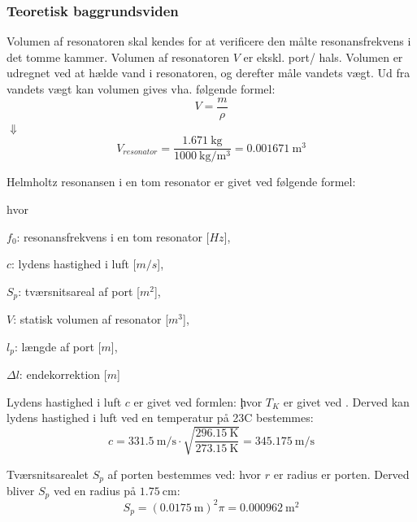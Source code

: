 	\subsubsection{Teoretisk baggrundsviden}	
Volumen af resonatoren skal kendes for at verificere den målte resonansfrekvens i det tomme kammer. 
Volumen af resonatoren $V$ er ekskl. port/ hals. Volumen er udregnet ved at hælde vand i resonatoren, og derefter måle vandets vægt. Ud fra vandets vægt kan volumen gives vha. følgende formel:  
\begin{equation}
  V=\frac{m}{\rho}
  \label{eq:vformel}
\end{equation}
$\Downarrow$
\begin{equation}
V_{resonator}=\frac{\SI{1,671}{\kilo\gram}}{\SI{1000}{\kilo \gram \per \meter^{3}}}={\SI{0,001671}{\meter^{3}}}
\end{equation}


Helmholtz resonansen i en tom resonator er givet ved følgende formel: \fnul

hvor 
\begin{description}[align=left, labelwidth=1in,labelindent=0.5cm]
\item $f_{0}$: resonansfrekvens i en tom resonator [$Hz$],\\
\item $c$: lydens hastighed i luft [$m/s$],\\
\item $S_{p}$: tværsnitsareal af port [$m^2$],\\
\item $V$: statisk volumen af resonator [$m^3$],\\
\item $l_{p}$: længde af port [$m$],\\
\item $\Delta l$: endekorrektion [$m$]\\
\end{description}
Lydens hastighed i luft $c$ er givet ved formlen: 
\c
hvor $T_{K}$ er givet ved \T. 
Derved kan lydens hastighed i luft ved en temperatur på 23\degree C bestemmes: 
\begin{equation}
		c = {\SI{331,5}{\meter / \second}} \cdot
		\sqrt{\frac{\SI{296,15}{\kelvin}}{\SI{273,15}{\kelvin}}} = {\SI{345,175}{\meter / \second}} 	\end{equation}
		
Tværsnitsarealet $S_{p}$ af porten bestemmes ved: 
\Sp 
hvor ${r}$ er radius er porten. 
Derved bliver $S_{p}$ ved en radius på ${\SI{1.75}{\centi \meter}}$:  
\begin{equation}
S_{p} = ({\SI{0,0175}{\meter}})^{2}\pi = {\SI{0,000962}{\meter^{2}}}	
\end{equation}  

